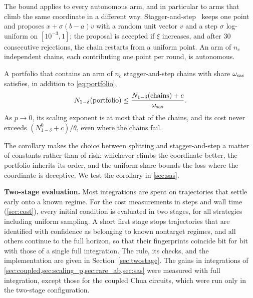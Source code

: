 The bound applies to every autonomous arm, and in particular to arms that climb the same coordinate in a different way. Stagger-and-step~\cite{SweetNusseYorke2001} keeps one point and proposes $x+\sigma(b-a)v$ with a random unit vector $v$ and a step $\sigma$ log-uniform on $[10^{-3},1]$; the proposal is accepted if $\xi$ increases, and after 30 consecutive rejections, the chain restarts from a uniform point. An arm of $n_c$ independent chains, each contributing one point per round, is autonomous.

\begin{corollary}\label{cor:sas}
A portfolio that contains an arm of $n_c$ stagger-and-step chains with share $\omega_{\rm sas}$ satisfies, in addition to \eqref{eq:portfolio},
\begin{equation*}
N_{1-\delta}(\text{portfolio})\le\frac{N_{1-\delta}(\text{chains})+c}{\omega_{\rm sas}}.
\end{equation*}
As $p\to0$, its scaling exponent is at most that of the chains, and its cost never exceeds $(N^0_{1-\delta}+c)/\theta$, even where the chains fail.
\end{corollary}

The corollary makes the choice between splitting and stagger-and-step a matter of constants rather than of risk: whichever climbs the coordinate better, the portfolio inherits its order, and the uniform share bounds the loss where the coordinate is deceptive. We test the corollary in \cref{sec:sas}.

\textbf{Two-stage evaluation.} Most integrations are spent on trajectories that settle early onto a known regime. For the cost measurements in steps and wall time (\cref{sec:cost}), every initial condition is evaluated in two stages, for all strategies including uniform sampling. A short first stage stops trajectories that are identified with confidence as belonging to known nontarget regimes, and all others continue to the full horizon, so that their fingerprints coincide bit for bit with those of a single full integration. The rule, its checks, and the implementation are given in Section~\ref{sec:twostage}. The gains in integrations of \cref{sec:coupled,sec:scaling_p,sec:rare_ab,sec:sas} were measured with full integration, except those for the coupled Chua circuits, which were run only in the two-stage configuration.
